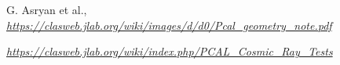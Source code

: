 \begin{thebibliography}{99}
 
  G. Asryan et al.,
  \emph{\url{https://clasweb.jlab.org/wiki/images/d/d0/Pcal_geometry_note.pdf}}

  \emph{\url{https://clasweb.jlab.org/wiki/index.php/PCAL_Cosmic_Ray_Tests}}


  
 
\end{thebibliography}
